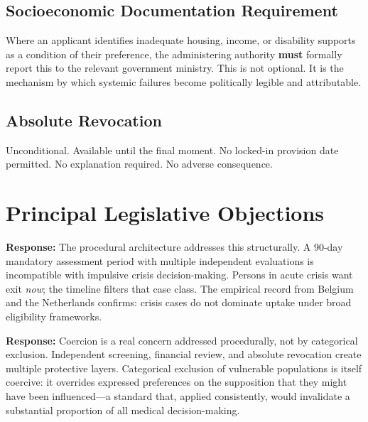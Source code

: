 \documentclass[11pt, letterpaper]{article}
\begin{document}
\subsection{Socioeconomic Documentation Requirement}

Where an applicant identifies inadequate housing, income, or disability supports as a
condition of their preference, the administering authority \textbf{must} formally report
this to the relevant government ministry. This is not optional. It is the mechanism by
which systemic failures become politically legible and attributable.

\subsection{Absolute Revocation}

Unconditional. Available until the final moment. No locked-in provision date permitted.
No explanation required. No adverse consequence.

\section{Principal Legislative Objections}

\begin{objectionbox}[title={\sffamily\bfseries\small\color{C@warning}
  Objection 1: ``This will be abused by people in temporary crisis''}]
\textbf{Response:} The procedural architecture addresses this structurally. A 90-day
mandatory assessment period with multiple independent evaluations is incompatible with
impulsive crisis decision-making. Persons in acute crisis want exit \emph{now}; the
timeline filters that case class. The empirical record from Belgium and the Netherlands
confirms: crisis cases do not dominate uptake under broad eligibility frameworks.
\end{objectionbox}

\medskip

\begin{objectionbox}[title={\sffamily\bfseries\small\color{C@warning}
  Objection 2: ``Vulnerable people will be pressured into it''}]
\textbf{Response:} Coercion is a real concern addressed procedurally, not by
categorical exclusion. Independent screening, financial review, and absolute revocation
create multiple protective layers. Categorical exclusion of vulnerable populations is
itself coercive: it overrides expressed preferences on the supposition that they might
have been influenced---a standard that, applied consistently, would invalidate a
substantial proportion of all medical decision-making.
\end{objectionbox}
\end{document}
